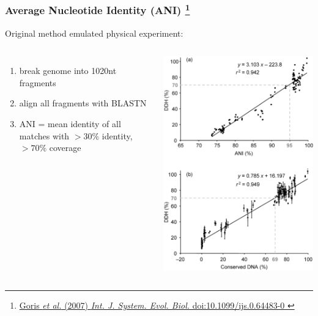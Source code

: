 %
\begin{frame}
  \frametitle{Average Nucleotide Identity (ANI)
  \footnote{\tiny{\href{http://dx.doi.org/10.1099/ijs.0.64483-0
}{Goris \textit{et al.} (2007) \textit{Int. J. System. Evol. Biol.} doi:10.1099/ijs.0.64483-0
}}}
  }
  Original method emulated physical experiment:
  \begin{columns}[T] 
      \begin{enumerate}
        \item \textcolor{hutton_green}{break genome into 1020nt fragments}
        \item \textcolor{hutton_blue}{align all fragments with BLASTN}
        \item \textcolor{hutton_purple}{ANI = mean identity of all matches with $>30\%$ identity, $>70\%$ coverage}
      \end{enumerate}
      \includegraphics[width=\textwidth]{images/ani_ddh_equiv}
  \end{columns}    
\end{frame}

